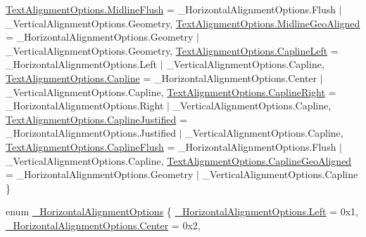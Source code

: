 \begin{DoxyCompactItemize}
\newline
\mbox{\hyperlink{namespace_t_m_pro_a1dd743b58b1fd4057c00e4b98ab86301a7e7951da1c2095827cf13200dcd14ef5}{Text\+Alignment\+Options.\+Midline\+Flush}} = \+\_\+\+Horizontal\+Alignment\+Options.\+Flush $\vert$ \+\_\+\+Vertical\+Alignment\+Options.\+Geometry, 
\mbox{\hyperlink{namespace_t_m_pro_a1dd743b58b1fd4057c00e4b98ab86301a512c9d105819d5e422f87b807ee0d2f2}{Text\+Alignment\+Options.\+Midline\+Geo\+Aligned}} = \+\_\+\+Horizontal\+Alignment\+Options.\+Geometry $\vert$ \+\_\+\+Vertical\+Alignment\+Options.\+Geometry, 
\mbox{\hyperlink{namespace_t_m_pro_a1dd743b58b1fd4057c00e4b98ab86301a1be1187314d85c932dade37f9700a10c}{Text\+Alignment\+Options.\+Capline\+Left}} = \+\_\+\+Horizontal\+Alignment\+Options.\+Left $\vert$ \+\_\+\+Vertical\+Alignment\+Options.\+Capline, 
\mbox{\hyperlink{namespace_t_m_pro_a1dd743b58b1fd4057c00e4b98ab86301ae5832b289b6f80984a1eda63ea8398d7}{Text\+Alignment\+Options.\+Capline}} = \+\_\+\+Horizontal\+Alignment\+Options.\+Center $\vert$ \+\_\+\+Vertical\+Alignment\+Options.\+Capline, 
\newline
\mbox{\hyperlink{namespace_t_m_pro_a1dd743b58b1fd4057c00e4b98ab86301ad74751c868940b92cb7d011abe211e31}{Text\+Alignment\+Options.\+Capline\+Right}} = \+\_\+\+Horizontal\+Alignment\+Options.\+Right $\vert$ \+\_\+\+Vertical\+Alignment\+Options.\+Capline, 
\mbox{\hyperlink{namespace_t_m_pro_a1dd743b58b1fd4057c00e4b98ab86301a738dd38db969a0bc09ec042e5231ab2f}{Text\+Alignment\+Options.\+Capline\+Justified}} = \+\_\+\+Horizontal\+Alignment\+Options.\+Justified $\vert$ \+\_\+\+Vertical\+Alignment\+Options.\+Capline, 
\mbox{\hyperlink{namespace_t_m_pro_a1dd743b58b1fd4057c00e4b98ab86301aa497cf12b7e41128a4a8434493d0832c}{Text\+Alignment\+Options.\+Capline\+Flush}} = \+\_\+\+Horizontal\+Alignment\+Options.\+Flush $\vert$ \+\_\+\+Vertical\+Alignment\+Options.\+Capline, 
\mbox{\hyperlink{namespace_t_m_pro_a1dd743b58b1fd4057c00e4b98ab86301ad0a0cdc45c6b0811544e9cdc043bb246}{Text\+Alignment\+Options.\+Capline\+Geo\+Aligned}} = \+\_\+\+Horizontal\+Alignment\+Options.\+Geometry $\vert$ \+\_\+\+Vertical\+Alignment\+Options.\+Capline
 \}
\item 
enum \mbox{\hyperlink{namespace_t_m_pro_a79f7a2a68b3f84bfa58703520cbf4398}{\+\_\+\+Horizontal\+Alignment\+Options}} \{ \newline
\mbox{\hyperlink{namespace_t_m_pro_a79f7a2a68b3f84bfa58703520cbf4398a945d5e233cf7d6240f6b783b36a374ff}{\+\_\+\+Horizontal\+Alignment\+Options.\+Left}} = 0x1, 
\mbox{\hyperlink{namespace_t_m_pro_a79f7a2a68b3f84bfa58703520cbf4398a4f1f6016fc9f3f2353c0cc7c67b292bd}{\+\_\+\+Horizontal\+Alignment\+Options.\+Center}} = 0x2, 

\end{DoxyCompactItemize}
